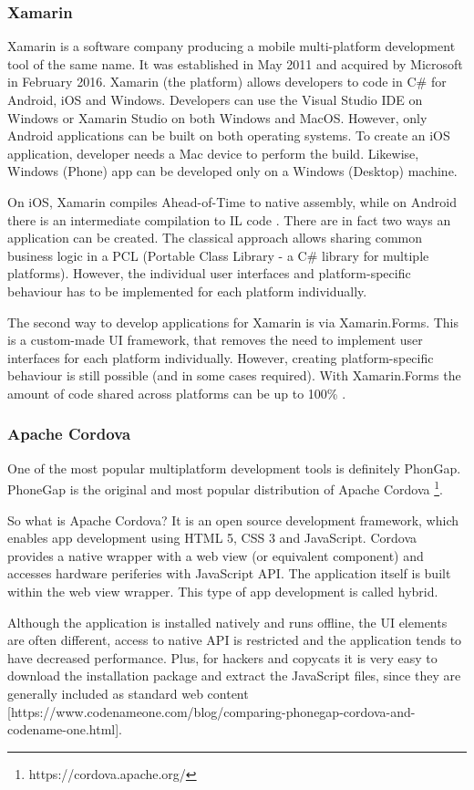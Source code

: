 \documentclass[english,master,public,dept460,male,cpdeclaration,oneside]{diploma}
\begin{document}
\subsubsection{Xamarin}
Xamarin is a software company producing a mobile multi-platform development tool of the same name. It was established in May 2011 and acquired by Microsoft in February 2016. Xamarin (the platform) allows developers to code in C\# for Android, iOS and Windows. Developers can use the Visual Studio IDE on Windows or Xamarin Studio on both Windows and MacOS. However, only Android applications can be built on both operating systems. To create an iOS application, developer needs a Mac device to perform the build. Likewise, Windows (Phone) app can be developed only on a Windows (Desktop) machine. 

On iOS, Xamarin compiles Ahead-of-Time to native assembly, while on Android there is an intermediate compilation to IL code \cite{xamarin}. There are in fact two ways an application can be created. The classical approach allows sharing common business logic in a PCL (Portable Class Library - a C\# library for multiple platforms). However, the individual user interfaces and platform-specific behaviour has to be implemented for each platform individually. 

The second way to develop applications for Xamarin is via Xamarin.Forms. This is a custom-made UI framework, that removes the need to implement user interfaces for each platform individually. However, creating platform-specific behaviour is still possible (and in some cases required). With Xamarin.Forms the amount of code shared across platforms can be up to 100\% \cite{xamarin}.

\subsubsection{Apache Cordova}
One of the most popular multiplatform development tools is definitely PhonGap. PhoneGap is the original and most popular distribution of Apache Cordova \footnote{https://cordova.apache.org/}. 

So what is Apache Cordova? It is an open source development framework, which enables app development using HTML 5, CSS 3 and JavaScript. Cordova provides a native wrapper with a web view (or equivalent component) and accesses hardware periferies with JavaScript API. The application itself is built within the web view wrapper. This type of app development is called hybrid. 

Although the application is installed natively and runs offline, the UI elements are often different, access to native API is restricted and the application tends to have decreased performance. Plus, for hackers and copycats it is very easy to download the installation package and extract the JavaScript files, since they are generally included as standard web content [https://www.codenameone.com/blog/comparing-phonegap-cordova-and-codename-one.html]. 
\end{document}
